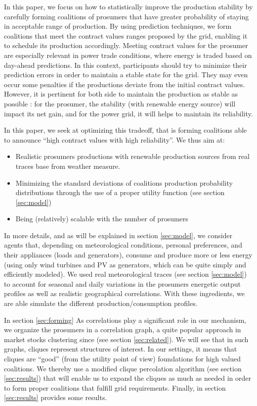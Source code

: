 \documentclass[conference]{IEEEtran}
\begin{document}
In this paper, we focus on how to statistically improve the production stability by carefully forming coalitions of prosumers that have greater probability of staying in acceptable range of production. By using prediction techniques, we form coalitions that meet the contract values ranges proposed by the grid, enabling it to schedule its production accordingly. Meeting contract values for the prosumer are especially relevant in power trade conditions, where energy is traded based on day-ahead predictions. In this context, participants should try to minimize their prediction errors in order to maintain a stable state for the grid. They may even occur some penalties if the productions deviate from the initial contract values. However, it is pertinent for both side to maintain the production as stable as possible : for the prosumer, the stability (with renewable energy source) will impact its net gain, and for the power grid, it will helps to maintain its reliability.

In this paper, we seek at optimizing this tradeoff, that is forming coalitions able to announce “high contract values with high reliability”. We thus aim at:
\begin{itemize}
\item Realistic prosumers productions with renewable production sources  from real traces base from weather measure.
\item Minimizing the standard deviations of coalitions production probability distributions through the use of a proper utility function (see section \ref{sec:model})
\item Being (relatively) scalable with the number of prosumers
\end{itemize}

In more details, and as will be explained in section \ref{sec:model}, we consider agents that, depending on meteorological conditions, personal preferences, and their appliances (loads and generators), consume and produce more or less energy (using only wind turbines and PV as generators, which can be quite simply and efficiently modeled).  We used real meteorological traces (see section \ref{sec:model}) to account for seasonal and daily variations in the prosumers energetic output profiles as well as realistic geographical correlations. With these ingredients, we are able simulate the different production/consumption profiles.

In section \ref{sec:forming} As correlations play a significant role in our mechanism, we organize the prosumers in a correlation graph, a quite popular approach in market stocks clustering since \cite{Mantegna1999} (see section \ref{sec:related}). We will see that in such graphs, cliques represent structures of interest. In our settings, it means that cliques are “good” (from the utility point of view) foundations for high valued coalitions. We thereby use a modified clique percolation algorithm (see section \ref{sec:results}) that will enable us to expand the cliques as much as needed in order to form proper coalitions that fulfill grid requirements. Finally, in section \ref{sec:results} provides some results.
\end{document}
